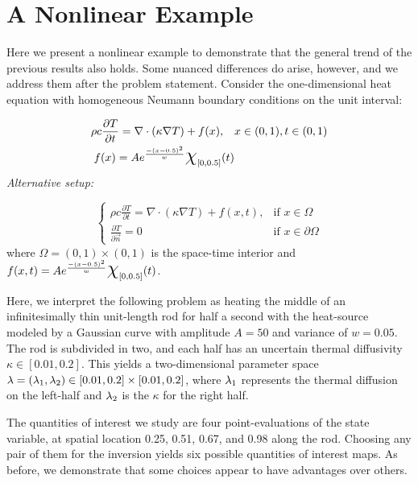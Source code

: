 \section{A Nonlinear Example}\label{sec:nonlinear}
Here we present a nonlinear example to demonstrate that the general trend of the previous results also holds. 
Some nuanced differences do arise, however, and we address them after the problem statement.
Consider the one-dimensional heat equation with homogeneous Neumann boundary conditions on the unit interval:

\begin{equation}
\begin{split}
\rho c \frac{\partial T}{\partial t} = \nabla \cdot ( \kappa \nabla T) + f(x), \quad & x\in (0,1), t\in (0,1) \\
f(x) = A e^\frac{- (x-0.5)^2}{w} \Chi_{[0,0.5]}(t) 
\end{split}
\end{equation}
\emph{Alternative setup: }

\begin{equation}
\begin{cases}
\rho c \frac{\partial T}{\partial t} = \nabla \cdot ( \kappa \nabla T) + f(x,t), & \text{if } x\in \Omega \\
\frac{\partial T}{\partial \vec{n}} = 0 & \text{if } x\in \partial \Omega
\end{cases}
\end{equation}
where $\Omega = (0,1)\times (0,1)$ is the space-time interior and $f(x,t) = A e^\frac{- (x-0.5)^2}{w} \Chi_{[0,0.5]}(t)$. 

Here, we interpret the following problem as heating the middle of an infinitesimally thin unit-length rod for half a second with the heat-source modeled by a Gaussian curve with amplitude $A=50$ and variance of $w=0.05$. 
The rod is subdivided in two, and each half has an uncertain thermal diffusivity $\kappa \in [0.01, 0.2]$.
This yields a two-dimensional parameter space $\lambda = (\lambda_1, \lambda_2) \in [0.01, 0.2]\times [0.01, 0.2]$, where $\lambda_1$ represents the thermal diffusion on the left-half and $\lambda_2$ is the $\kappa$ for the right half.

The quantities of interest we study are four point-evaluations of the state variable, at spatial location 0.25, 0.51, 0.67, and 0.98 along the rod.
Choosing any pair of them for the inversion yields six possible quantities of interest maps. 
As before, we demonstrate that some choices appear to have advantages over others. 

